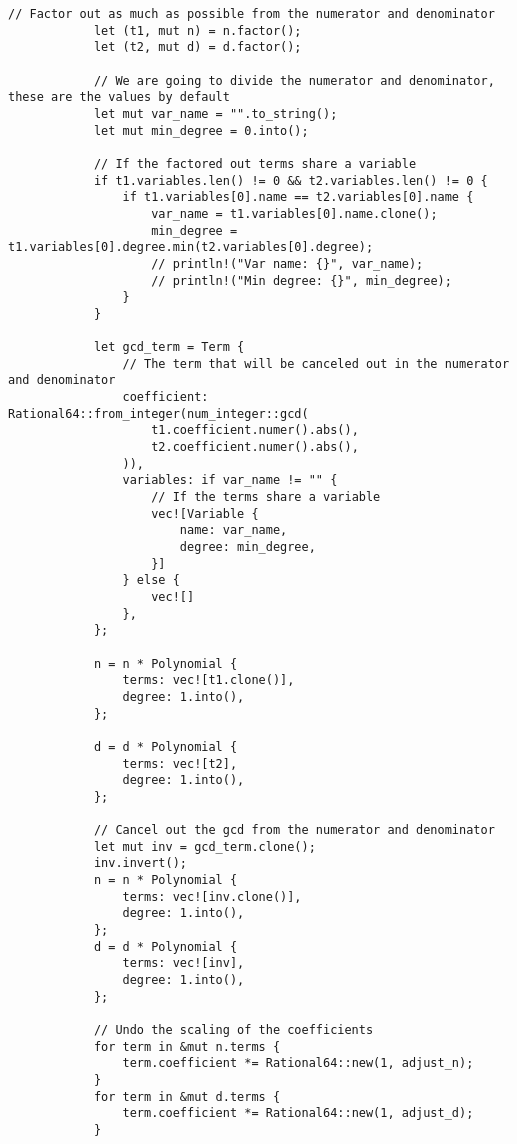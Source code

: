 \begin{lstlisting}[caption={The implementation of the \texttt{simplify()} method for the \texttt{PolyRatio} struct}, label={lst:polyratio-simplify}]
            // Factor out as much as possible from the numerator and denominator
            let (t1, mut n) = n.factor();
            let (t2, mut d) = d.factor();
    
            // We are going to divide the numerator and denominator, these are the values by default
            let mut var_name = "".to_string();
            let mut min_degree = 0.into();
    
            // If the factored out terms share a variable
            if t1.variables.len() != 0 && t2.variables.len() != 0 {
                if t1.variables[0].name == t2.variables[0].name {
                    var_name = t1.variables[0].name.clone();
                    min_degree = t1.variables[0].degree.min(t2.variables[0].degree);
                    // println!("Var name: {}", var_name);
                    // println!("Min degree: {}", min_degree);
                }
            }
    
            let gcd_term = Term {
                // The term that will be canceled out in the numerator and denominator
                coefficient: Rational64::from_integer(num_integer::gcd(
                    t1.coefficient.numer().abs(),
                    t2.coefficient.numer().abs(),
                )),
                variables: if var_name != "" {
                    // If the terms share a variable
                    vec![Variable {
                        name: var_name,
                        degree: min_degree,
                    }]
                } else {
                    vec![]
                },
            };

            n = n * Polynomial {
                terms: vec![t1.clone()],
                degree: 1.into(),
            };

            d = d * Polynomial {
                terms: vec![t2],
                degree: 1.into(),
            };
    
            // Cancel out the gcd from the numerator and denominator
            let mut inv = gcd_term.clone();
            inv.invert();
            n = n * Polynomial {
                terms: vec![inv.clone()],
                degree: 1.into(),
            };
            d = d * Polynomial {
                terms: vec![inv],
                degree: 1.into(),
            };
    
            // Undo the scaling of the coefficients
            for term in &mut n.terms {
                term.coefficient *= Rational64::new(1, adjust_n);
            }
            for term in &mut d.terms {
                term.coefficient *= Rational64::new(1, adjust_d);
            }
    

\end{lstlisting}

